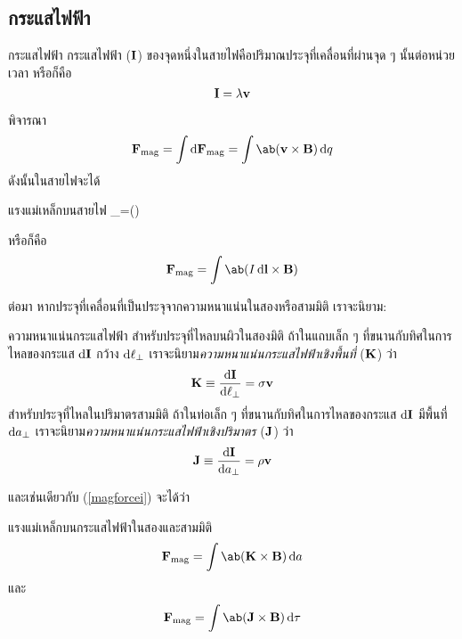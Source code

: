 \subsection{กระแสไฟฟ้า}
\begin{defbox}{กระแสไฟฟ้า}
    กระแสไฟฟ้า ($\mathbf{I}$) ของจุดหนึ่งในสายไฟคือปริมาณประจุที่เคลื่อนที่ผ่านจุด ๆ นั้นต่อหน่วยเวลา หรือก็คือ
    \begin{equation}
        \mathbf{I} = \lambda\mathbf{v}
    \end{equation}
\end{defbox}
พิจารณา
\[\vb{F}_\txt{mag}=\int\odif{\vb{F}_\txt{mag}}=\int\ab(\vb{v}\times\vb{B})\odif{q}\]
ดังนั้นในสายไฟจะได้
\begin{eqbox}{แรงแม่เหล็กบนสายไฟ}
    _=\int\ab(\times{})\odif{\ell}\label{magforcei}
\end{eqbox}
หรือก็คือ
\begin{equation}
    \vb{F}_\txt{mag}=\int\ab(I\odif{\vb{l}}\times\vb{B})
\end{equation}

ต่อมา หากประจุที่เคลื่อนที่เป็นประจุจากความหนาแน่นในสองหรือสามมิติ เราจะนิยาม:
\begin{defbox}{ความหนาแน่นกระแสไฟฟ้า}
    สำหรับประจุที่ไหลบนผิวในสองมิติ ถ้าในแถบเล็ก ๆ ที่ขนานกับทิศในการไหลของกระแส $\odif{\vb{I}}$ กว้าง $\odif{\ell_\perp}$ เราจะนิยาม\emph{ความหนาแน่นกระแสไฟฟ้าเชิงพื้นที่} ($\mathbf{K}$) ว่า
    \begin{equation}
        \vb{K}\equiv\frac{\odif{\vb{I}}}{\odif{\ell_\perp}}=\sigma\vb{v}
    \end{equation}
    สำหรับประจุที่ไหลในปริมาตรสามมิติ ถ้าในท่อเล็ก ๆ ที่ขนานกับทิศในการไหลของกระแส $\odif{\vb{I}}$ มีพื้นที่ $\odif{a_\perp}$ เราจะนิยาม\emph{ความหนาแน่นกระแสไฟฟ้าเชิงปริมาตร} ($\mathbf{J}$) ว่า
    \begin{equation}
        \vb{J}\equiv\frac{\odif{\vb{I}}}{\odif{a_\perp}}=\rho\vb{v}
    \end{equation}
\end{defbox}
และเช่นเดียวกับ (\ref{magforcei}) จะได้ว่า
\begin{corbox}{แรงแม่เหล็กบนกระแสไฟฟ้าในสองและสามมิติ}
    \begin{equation}
        \vb{F}_\txt{mag}=\int\ab(\vb{K}\times\vb{B})\odif{a}
    \end{equation}
    และ
    \begin{equation}
        \vb{F}_\txt{mag}=\int\ab(\vb{J}\times\vb{B})\odif{\tau}
    \end{equation}
\end{corbox}
